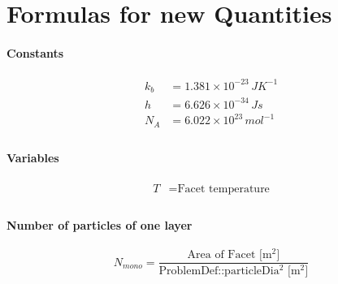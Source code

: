 
\chapter{Formulas for new Quantities}\label{chapter:Formulas}

\subsubsection*{Constants}
\begin{equation}
	\begin{split}
	k_b&=1.381\times10^{-23}\,JK^{-1}\\
	h&=6.626\times10^{-34}\,Js\\
	N_A&=6.022\times10^{23}\,mol^{-1}\\
	\end{split}
\end{equation}


\subsubsection*{Variables}
\begin{equation}
	\begin{split}
	T&=\text{Facet temperature}\\
	\end{split}
\end{equation}

\subsubsection*{Number of particles of one layer}
\begin{equation}
	\label{eq:nmono}
	N_{mono}=\frac{\text{Area of Facet [m$^2$]}}{\text{ProblemDef::particleDia$^2$ [m$^2$]}}
\end{equation}


